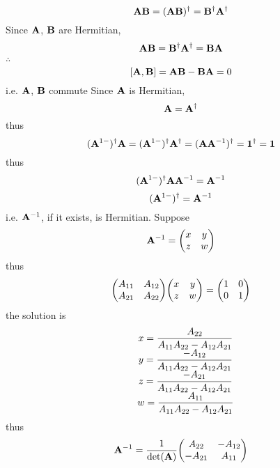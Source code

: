 \documentclass[a4paper]{article}
\begin{document}
\begin{equation}\label{key}
\vb{A}\vb{B} = (\vb{A}\vb{B})^\dagger = \vb{B}^\dagger \vb{A}^\dagger
\end{equation}
Since $ \vb{A} $, $ \vb{B} $ are Hermitian,
\begin{equation}\label{key}
\vb{A}\vb{B} = \vb{B}^\dagger \vb{A}^\dagger = \vb{B}\vb{A}
\end{equation}
$ \therefore $
\begin{equation}\label{key}
[\vb{A}, \vb{B}] = \vb{A}\vb{B} - \vb{B}\vb{A} = 0
\end{equation}
i.e. $ \vb{A} $, $ \vb{B} $ commute
Since $ \vb{A} $ is Hermitian,
\begin{equation}\label{key}
\vb{A} = \vb{A}^\dagger
\end{equation}
thus
\begin{equation}\label{key}
(\vb{A}^{1-})^\dagger \vb{A} = (\vb{A}^{1-})^\dagger \vb{A}^\dagger = (\vb{A}\vb{A}^{-1})^\dagger = {\large \bm{1}}^\dagger = {\large \bm{1}}
\end{equation}
thus
\begin{equation}\label{key}
(\vb{A}^{1-})^\dagger \vb{A} \vb{A}^{-1} = \vb{A}^{-1}
\end{equation}
\begin{equation}\label{key}
(\vb{A}^{1-})^\dagger = \vb{A}^{-1}
\end{equation}
i.e. $ \vb{A}^{-1} $, if it exists, is Hermitian.
Suppose
\begin{equation}\label{key}
\vb{A}^{-1} = \mqty(x & y\\z & w)
\end{equation}
thus
\begin{equation}\label{key}
\mqty(A_{11} & A_{12}\\A_{21} & A_{22})\mqty(x & y\\z & w) = \mqty(1 & 0\\0 & 1)
\end{equation}
the solution is
\begin{equation}\label{key}
\mqty{
	&x = \dfrac{A_{22}}{A_{11}A_{22} - A_{12}A_{21}}\\
	&y = \dfrac{-A_{12}}{A_{11}A_{22} - A_{12}A_{21}}\\
	&z = \dfrac{-A_{21}}{A_{11}A_{22} - A_{12}A_{21}}\\
	&w = \dfrac{A_{11}}{A_{11}A_{22} - A_{12}A_{21}}\\ 
}
\end{equation}
thus
\begin{equation}\label{key}
\vb{A}^{-1} = \dfrac{1}{\det(\vb{A})} \mqty(A_{22} & -A_{12}\\ -A_{21} & A_{11})
\end{equation}
\end{document}
